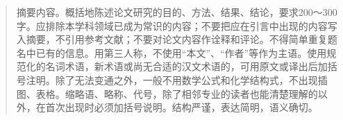 \ifShowCover %
\fi %

\ifShowTOC %
\tableofcontents %
\newpage %
\fi %

\setcounter{page}{1} %
\maketitle %

\ifShowCnAbstract %
\renewcommand{\abstractname}{\zihao{5} \heiti \mdseries 摘\quad 要} %
\begin{abstract} %
    摘要内容。概括地陈述论文研究的目的、方法、结果、结论，要求200～300字。应排除本学科领域已成为常识的内容；不要把应在引言中出现的内容写入摘要，不引用参考文献；不要对论文内容作诠释和评论。不得简单重复题名中已有的信息。用第三人称，不使用“本文”、“作者”等作为主语。使用规范化的名词术语，新术语或尚无合适的汉文术语的，可用原文或译出后加括号注明。除了无法变通之外，一般不用数学公式和化学结构式，不出现插图、表格。缩略语、略称、代号，除了相邻专业的读者也能清楚理解的以外，在首次出现时必须加括号说明。结构严谨，表达简明，语义确切。 %
    \par {} %
\end{abstract} %
\fi %

